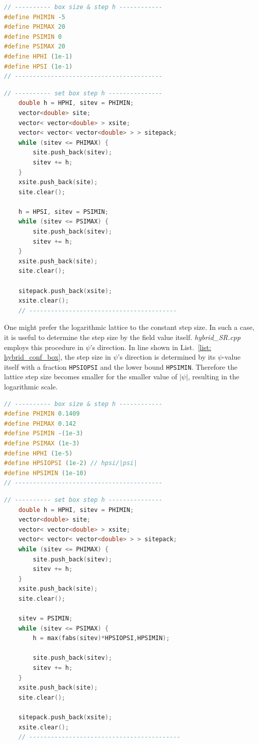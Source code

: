 \documentclass[aps, prd
, preprint
, nofootinbib 
, notitlepage
, superscriptaddress
, longbibliography
]{revtex4-1}
\newcommand{\Blue}[1]{\textcolor{blue}{\sffamily #1}}
\begin{document}
\begin{lstlisting}[language = C++, caption={\textit{sample/double\_chaotic\_SR.cpp}}, label=list: double_chaotic_conf_box, firstnumber = 6]
// ---------- box size & step h ------------
#define PHIMIN -5
#define PHIMAX 20
#define PSIMIN 0
#define PSIMAX 20
#define HPHI (1e-1)
#define HPSI (1e-1)
// -----------------------------------------
\end{lstlisting}
\begin{lstlisting}[language = C++, firstnumber = 52]
	// ---------- set box step h ---------------
	double h = HPHI, sitev = PHIMIN;
	vector<double> site;
	vector< vector<double> > xsite;
	vector< vector< vector<double> > > sitepack;
	while (sitev <= PHIMAX) {
		site.push_back(sitev);
		sitev += h;
	}
	xsite.push_back(site);
	site.clear();

	h = HPSI, sitev = PSIMIN;
	while (sitev <= PSIMAX) {
		site.push_back(sitev);
		sitev += h;
	}
	xsite.push_back(site);
	site.clear();
	
	sitepack.push_back(xsite);
	xsite.clear();
	// -----------------------------------------
\end{lstlisting}

One might prefer the logarithmic lattice to the constant step size. In such a case, it is useful to determine the step size by the field value itself.
\textit{hybrid\_SR.cpp} employs this procedure in $\psi$'s direction.
In line \Blue{70} shown in List.~\ref{list: hybrid_conf_box}, the step size in $\psi$'s direction is determined by its $\psi$-value itself with a fraction \texttt{HPSIOPSI}
and the lower bound \texttt{HPSIMIN}. Therefore the lattice step size becomes smaller for the smaller value of $|\psi|$, resulting in the logarithmic scale.

\begin{lstlisting}[language = C++, caption={\textit{sample/hybrid\_SR.cpp}}, label=list: hybrid_conf_box, firstnumber = 6]
// ---------- box size & step h ------------
#define PHIMIN 0.1409
#define PHIMAX 0.142
#define PSIMIN -(1e-3)
#define PSIMAX (1e-3)
#define HPHI (1e-5)
#define HPSIOPSI (1e-2) // hpsi/|psi|
#define HPSIMIN (1e-10)
// -----------------------------------------
\end{lstlisting}
\begin{lstlisting}[language = C++, firstnumber = 57]
	// ---------- set box step h ---------------
	double h = HPHI, sitev = PHIMIN;
	vector<double> site;
	vector< vector<double> > xsite;
	vector< vector< vector<double> > > sitepack;
	while (sitev <= PHIMAX) {
		site.push_back(sitev);
		sitev += h;
	}
	xsite.push_back(site);
	site.clear();

	sitev = PSIMIN;
	while (sitev <= PSIMAX) {
		h = max(fabs(sitev)*HPSIOPSI,HPSIMIN);

		site.push_back(sitev);
		sitev += h;	
	}
	xsite.push_back(site);
	site.clear();
	
	sitepack.push_back(xsite);
	xsite.clear();
	// ------------------------------------------
\end{lstlisting}
\end{document}
